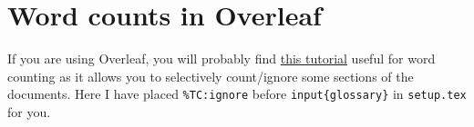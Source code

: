 \section{Word counts in Overleaf}

If you are using Overleaf, you will probably find \href{https://www.overleaf.com/learn/how-to/Is_there_a_way_to_run_a_word_count_that_doesn\%27t_include_LaTeX_commands\%3F}{this tutorial} useful for word counting as it allows you to selectively count/ignore some sections of the documents. Here I have placed \texttt{\%TC:ignore} before \texttt{input\{glossary\}} in \texttt{setup.tex} for you.